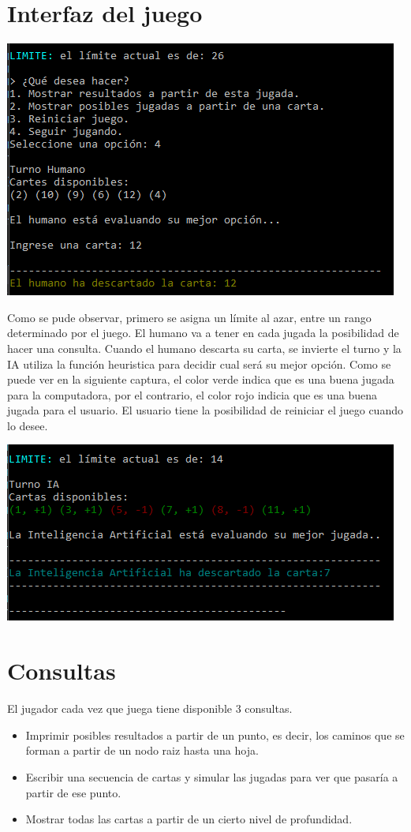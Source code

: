 \documentclass[12pt,a4paper]{article}
\begin{document}
\section{Interfaz del juego}
\begin{center}
\includegraphics[scale=0.7]{captura1.PNG} 
\end{center}
Como se pude observar, primero se asigna un límite al azar, entre un rango determinado por el juego. El humano va a tener en cada jugada la posibilidad de hacer una consulta. Cuando el humano descarta su carta, se invierte el turno y la IA utiliza la función heuristica para decidir cual será su mejor opción. Como se puede ver en la siguiente captura, el color verde indica que es una buena jugada para la computadora, por el contrario, el color rojo indicia que es una buena jugada para el usuario. El usuario tiene la posibilidad de reiniciar el juego cuando lo desee.

\begin{center}
\includegraphics[scale=0.7]{captura2.PNG} 
\end{center}

\section{Consultas}
El jugador cada vez que juega tiene disponible 3 consultas.
\begin{itemize}
\item Imprimir posibles resultados a partir de un punto, es decir, los caminos que se forman a partir de un nodo raiz hasta una hoja.
\item Escribir una secuencia de cartas y simular las jugadas para ver que pasaría a partir de ese punto.
\item Mostrar todas las cartas a partir de un cierto nivel de profundidad.
\end{itemize}
\end{document}
